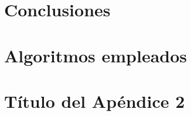\documentclass[spanish,a4paper,11pt,twoside]{report}
\begin{document}


\chapter{Conclusiones}
\label{chapter:conclusiones}




\newpage{\pagestyle{empty}\cleardoublepage}
\thispagestyle{empty}
\begin{appendix}

\chapter{Algoritmos empleados}
\label{appendix:1}



\chapter{Título del Apéndice 2}
\label{appendix:2}



\end{appendix}





\nocite{*}

\end{document}
